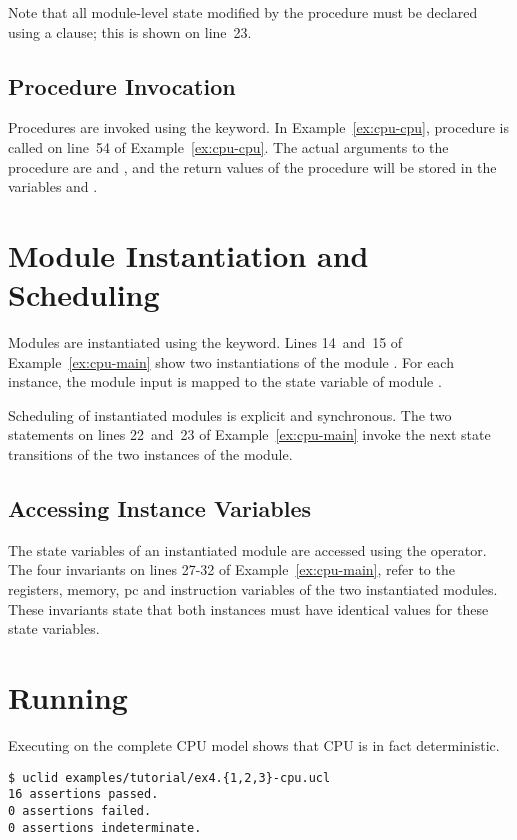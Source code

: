 Note that all module-level state modified by the procedure must be declared using a  clause; this is shown on line~23.

\subsection{Procedure Invocation}
Procedures are invoked using the  keyword. In Example~\ref{ex:cpu-cpu}, procedure  is called on line~54 of Example~\ref{ex:cpu-cpu}. The actual arguments to the procedure are  and , and the return values of the procedure will be stored in the variables  and .

\section{Module Instantiation and Scheduling}

Modules are instantiated using the  keyword. Lines 14~and~15 of Example~\ref{ex:cpu-main} show two instantiations of the module . For each instance, the module input  is mapped to the state variable  of module .

Scheduling of instantiated modules is explicit and synchronous. The two  statements on lines 22~and~23 of Example~\ref{ex:cpu-main} invoke the next state transitions of the two instances of the  module.

\subsection{Accessing Instance Variables}
The state variables of an instantiated module are accessed using the \codelike{->} operator. The four invariants on lines 27-32 of Example~\ref{ex:cpu-main}, refer to the registers, memory, pc and instruction variables of the two instantiated modules. These invariants state that both instances must have identical values for these state variables.


\section{Running \uclid{}}

Executing \uclid{} on the complete CPU model shows that CPU is in fact deterministic. 

\begin{Verbatim}[frame=single, samepage=true]
$ uclid examples/tutorial/ex4.{1,2,3}-cpu.ucl 
16 assertions passed.
0 assertions failed.
0 assertions indeterminate.
\end{Verbatim}

